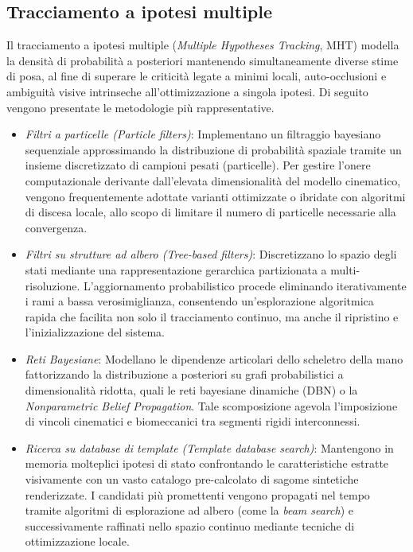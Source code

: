 \subsection{Tracciamento a ipotesi multiple}

Il tracciamento a ipotesi multiple (\emph{Multiple Hypotheses Tracking}, MHT) modella la densità di probabilità a posteriori mantenendo simultaneamente diverse stime di posa, al fine di superare le criticità legate a minimi locali, auto-occlusioni e ambiguità visive intrinseche all'ottimizzazione a singola ipotesi. 
Di seguito vengono presentate le metodologie più rappresentative.

\begin{itemize}
    \item \emph{Filtri a particelle (Particle filters)}: 
    Implementano un filtraggio bayesiano sequenziale approssimando la distribuzione di probabilità spaziale tramite un insieme discretizzato di campioni pesati (particelle). 
    Per gestire l'onere computazionale derivante dall'elevata dimensionalità del modello cinematico, vengono frequentemente adottate varianti ottimizzate o ibridate con algoritmi di discesa locale, allo scopo di limitare il numero di particelle necessarie alla convergenza.

    \item \emph{Filtri su strutture ad albero (Tree-based filters)}:
    Discretizzano lo spazio degli stati mediante una rappresentazione gerarchica partizionata a multi-risoluzione. 
    L'ag\-gior\-na\-men\-to probabilistico procede eliminando iterativamente i rami a bassa verosimiglianza, consentendo un'esplorazione algoritmica rapida che facilita non solo il tracciamento continuo, ma anche il ripristino e l'inizializzazione del sistema.
    
    \item \emph{Reti Bayesiane}: 
    Modellano le dipendenze articolari dello scheletro della mano fattorizzando la distribuzione a posteriori su grafi probabilistici a dimensionalità ridotta, quali le reti bayesiane dinamiche (DBN) o la \emph{Nonparametric Belief Propagation}. 
    Tale scomposizione agevola l'imposizione di vincoli cinematici e biomeccanici tra segmenti rigidi interconnessi.
    
    \item \emph{Ricerca su database di template (Template database search)}: 
    Mantengono in memoria molteplici ipotesi di stato confrontando le caratteristiche estratte visivamente con un vasto catalogo pre-calcolato di sagome sintetiche renderizzate. 
    I candidati più promettenti vengono propagati nel tempo tramite algoritmi di esplorazione ad albero (come la \emph{beam search}) e successivamente raffinati nello spazio continuo mediante tecniche di ottimizzazione locale.
\end{itemize}

